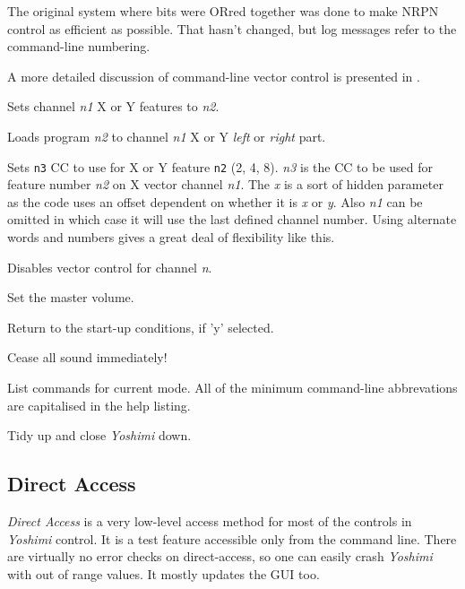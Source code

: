       The original system where bits were ORred together was done to make NRPN
      control as efficient as possible. That hasn't changed, but log messages
      refer to the command-line numbering.

      A more detailed discussion of command-line vector control is presented in
      .

      Sets channel \textsl{n1} X or Y features to \textsl{n2}.

      Loads program \textsl{n2} to channel \textsl{n1} X or Y
      \textsl{left} or \textsl{right} part.

      Sets \texttt{n3} CC to use for X or Y feature \texttt{n2} (2, 4, 8).
      \textsl{n3} is the CC to be used for feature number \textsl{n2} on X
      vector channel \textsl{n1}. The \textsl{x} is a sort of hidden parameter
      as the code uses an offset dependent on whether it is \textsl{x} or
      \textsl{y}. Also \textsl{n1} can be omitted in which case it will use the
      last defined channel number. Using alternate words and numbers gives a
      great deal of flexibility like this.

      Disables vector control for channel \textsl{n}.

      Set the master volume.

      Return to the start-up conditions, if 'y' selected.

      Cease all sound immediately!

      List commands for current mode.  All of the minimum command-line
      abbrevations are capitalised in the help listing.

         Tidy up and close \textsl{Yoshimi} down.

\subsection{Direct Access}
\label{subsec:command_line_direct_access}

   \textsl{Direct Access} is a very low-level access method for most of the
   controls in \textsl{Yoshimi} control.
   It is a test feature accessible only from the command line.
   There are virtually no error checks on direct-access, so one can easily
   crash \textsl{Yoshimi} with out of range values.
   It mostly updates the GUI too.

